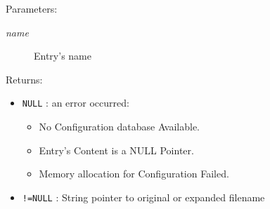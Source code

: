 \begin{Desc}
\item[Parameters:]
\begin{description}
\item[{\em name}]Entry's name\end{description}
\end{Desc}
\begin{Desc}
\item[Returns:]\begin{itemize}
\item {\tt NULL} : an error occurred:\begin{itemize}
\item No Configuration database Available. \item Entry's Content is a NULL Pointer. \item Memory allocation for Configuration Failed. \end{itemize}
\end{itemize}
\begin{itemize}
\item {\tt !=NULL} : String pointer to original or expanded filename \end{itemize}
\end{Desc}
